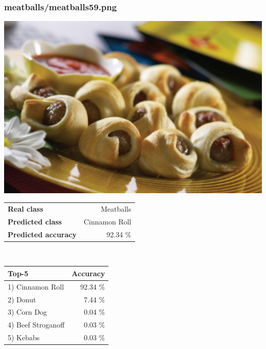 \subsubsection{meatballs/meatballs59.png}

\begin{minipage}[t]{0.4\textwidth}
	\vspace{0pt}
	\includegraphics[width=\linewidth]{images/evaluation-images/meatballs/meatballs59.png}
\end{minipage}
\hfill
\begin{minipage}[t]{0.5\textwidth}
	\vspace{0pt}\raggedright
	\begin{tabularx}{\textwidth}{X r}
		\small \textbf{Real class} & \small Meatballs\\
		\small \textbf{Predicted class} & \small Cinnamon Roll\\
		\small \textbf{Predicted accuracy} & \small 92.34 \%
    \end{tabularx}\\
    
    \vspace{6pt}
	\begin{tabularx}{\textwidth}{X r}
        \small \textbf{Top-5} & \small \textbf{Accuracy} \\
        \hline
		\small 1) Cinnamon Roll & \small 92.34 \%\\\small 2) Donut & \small 7.44 \%\\\small 3) Corn Dog & \small 0.04 \%\\\small 4) Beef Stroganoff & \small 0.03 \%\\\small 5) Kebabs & \small 0.03 \%
    \end{tabularx}
\end{minipage}
    
